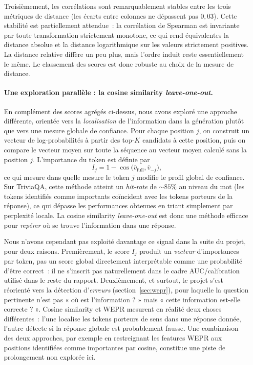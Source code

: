 \documentclass[12pt,a4paper]{article}
\begin{document}
Troisièmement, les corrélations sont remarquablement stables entre les trois métriques de distance (les écarts entre colonnes ne dépassent pas $0{,}03$). Cette stabilité est partiellement attendue~: la corrélation de Spearman est invariante par toute transformation strictement monotone, ce qui rend équivalentes la distance absolue et la distance logarithmique sur les valeurs strictement positives. La distance relative diffère un peu plus, mais l'ordre induit reste essentiellement le même. Le classement des scores est donc robuste au choix de la mesure de distance.

\paragraph{Une exploration parallèle : la cosine similarity \textit{leave-one-out}.}
En complément des scores agrégés ci-dessus, nous avons exploré une approche différente, orientée vers la \emph{localisation} de l'information dans la génération plutôt que vers une mesure globale de confiance. Pour chaque position $j$, on construit un vecteur de log-probabilités à partir des top-$K$ candidats à cette position, puis on compare le vecteur moyen sur toute la séquence au vecteur moyen calculé sans la position $j$. L'importance du token est définie par
\[
I_j = 1 - \cos\big(\overline{v}_{\text{full}}, \overline{v}_{-j}\big),
\]
ce qui mesure dans quelle mesure le token $j$ modifie le profil global de confiance. Sur TriviaQA, cette méthode atteint un \emph{hit-rate} de $\sim 85\%$ au niveau du mot (les tokens identifiés comme importants coïncident avec les tokens porteurs de la réponse), ce qui dépasse les performances obtenues en triant simplement par perplexité locale. La cosine similarity \emph{leave-one-out} est donc une méthode efficace pour \emph{repérer} où se trouve l'information dans une réponse.

Nous n'avons cependant pas exploité davantage ce signal dans la suite du projet, pour deux raisons. Premièrement, le score $I_j$ produit un \emph{vecteur} d'importances par token, pas un score global directement interprétable comme une probabilité d'être correct~: il ne s'inscrit pas naturellement dans le cadre AUC/calibration utilisé dans le reste du rapport. Deuxièmement, et surtout, le projet s'est réorienté vers la détection d'\emph{erreurs} (section~\ref{sec:wepr}), pour laquelle la question pertinente n'est pas « où est l'information ? » mais « cette information est-elle correcte ? ». Cosine similarity et WEPR mesurent en réalité deux choses différentes~: l'une localise les tokens porteurs de sens dans une réponse donnée, l'autre détecte si la réponse globale est probablement fausse. Une combinaison des deux approches, par exemple en restreignant les features WEPR aux positions identifiées comme importantes par cosine, constitue une piste de prolongement non explorée ici.
\end{document}
